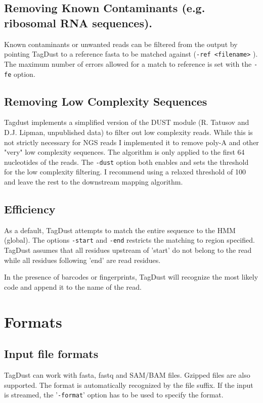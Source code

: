 \documentclass[11pt,a4paper,oneside]{book}
\begin{document}
\subsection{Removing Known Contaminants (e.g. ribosomal RNA sequences).}
Known contaminants or unwanted reads can be filtered from the output by pointing TagDust to a reference fasta to be matched against ({\tt -ref <filename>} ). The maximum number of errors allowed for a match to reference is set with the {\tt -fe} option.
\subsection{Removing Low Complexity Sequences}
Tagdust implements a simplified version of the DUST module (R. Tatusov and D.J. Lipman, unpublished data) to filter out low complexity reads. While this is not strictly necessary for NGS reads I implemented it to remove poly-A and other "very" low complexity sequences. The algorithm is only applied to the first 64 nucleotides of the reads. The {\tt -dust} option both enables and sets the threshold for the low complexity filtering. I recommend using a relaxed threshold of 100 and leave the rest to the downstream mapping algorithm. 


\subsection{Efficiency}
As a default, TagDust attempts to match the entire sequence to the HMM (global). The options {\tt -start} and {\tt -end} restricts the matching to region specified. TagDust assumes that all residues upstream of 'start' do not belong to the read while all residues following 'end' are read residues.

In the presence of barcodes or fingerprints, TagDust will recognize the most likely code and append it to the name of the read. 

\section{Formats}
\subsection{Input file formats}

TagDust can work with fasta, fastq and SAM/BAM files. Gzipped files are also supported. The format is automatically recognized by the file suffix. If the input is streamed, the '{\tt -format}' option has to be used to specify the format.\\
 
\end{document}
